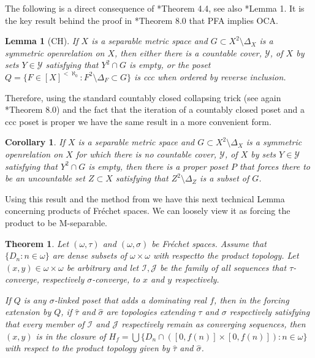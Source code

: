 \documentclass{amsart}
\newtheorem{theorem}[thm]{Theorem}
\newtheorem{corollary}[thm]{Corollary}
\newtheorem{lemma}[thm]{Lemma}
\theoremstyle{definition}
\theoremstyle{remark}
\begin{document}
The following is a direct consequence of
\cite{StevoPPT}*{Theorem 4.4}, see also 
\cite{Justin}*{Lemma 1}.  It is the key result behind the proof in \cite{StevoPPT}*{Theorem 8.0}
that PFA implies OCA.

\begin{lemma}[CH] If $X$ is a separable metric space and $G\subset X^2\setminus\Delta_X$ is a 
symmetric open\label{preOCA} relation on $X$, 
then either there is a countable cover, $\mathcal Y$, of $X$ by sets
 $Y\in\mathcal Y$ satisfying that $Y^2\cap G$ is empty, or
 the poset $Q=\{ F\in [X]^{<\aleph_0} : F^2\setminus \Delta_F \subset G\}$ is
 ccc when ordered by reverse inclusion.
\end{lemma}

Therefore, using the standard countably closed collapsing trick
 (see again \cite{StevoPPT}*{Theorem 8.0}) and the fact that the iteration
 of a countably closed poset and a ccc poset is proper we
 have the same result in a more convenient form.

\begin{corollary}
 If $X$ is a separable metric space and $G\subset X^2\setminus\Delta_X$ is a 
symmetric open\label{properOCA} relation on $X$ for which
there is no countable cover, $\mathcal Y$, of $X$ by sets
 $Y\in\mathcal Y$ satisfying that $Y^2\cap G$ is empty,
  then there is   a proper poset $P$ that forces there
  to be an uncountable set $Z\subset X$ satisfying
  that $Z^2\setminus \Delta_Z$ is a subset of $G$.
\end{corollary}

Using this result and the method from \cite{MA3} we have this next
technical Lemma 
concerning products of Fr\'echet spaces.
We can loosely view it as forcing the product to be M-separable.

\begin{theorem} Let $(\omega,\tau)$ and $(\omega,\sigma)$ be Fr\'echet spaces. 
Assume that $\{ D_n : n\in\omega\}$ are dense subsets of $\omega\times\omega$
with respect\label{technical} to the product topology. Let $(x,y)\in \omega\times\omega$
be arbitrary and let $\mathcal I, \mathcal J$ be the family of all
sequences that $\tau$-converge, respectively $\sigma$-converge, to
 $x$ and $y$ respectively. 

If $Q$ is any $\sigma$-linked poset that adds a dominating real
 $f$, then in the forcing extension by $Q$, if $\hat\tau$ and 
 $\hat \sigma$ are topologies extending $\tau$ and $\sigma$ respectively
 satisfying that every member of $\mathcal I$ and $\mathcal J$ respectively
 remain as converging sequences, then $(x,y)$ is in the 
 closure of $H_f = \bigcup \{ D_n\cap \left( [0,f(n)]\times [0,f(n)]\right) : 
 n\in\omega\}$ with respect to the product topology given
 by $\hat\tau $ and $\hat \sigma $.
\end{theorem}
\end{document}

